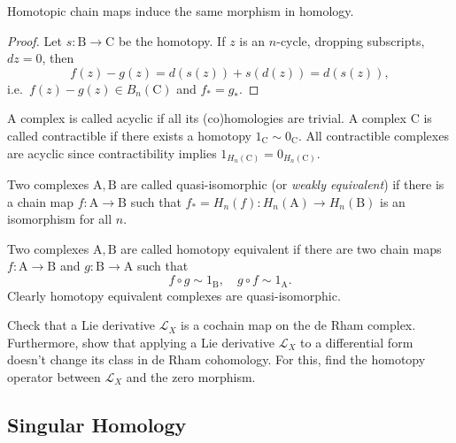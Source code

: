 \documentclass[english,letterpaper]{article}%
\numberwithin{equation}{section}
\numberwithin{figure}{section}
\numberwithin{table}{section}
\theoremstyle{definition}
\theoremstyle{definition}
\theoremstyle{definition}
\theoremstyle{plain}
\theoremstyle{plain}
\theoremstyle{plain}
\theoremstyle{plain}
\theoremstyle{remark}
\theoremstyle{remark}
\newcommand{\bm}[1]{\boldsymbol{\mathrm{#1}}}
\newcommand{\Lie}{\mathcal{L}}
\begin{document}
\begin{thm}
    Homotopic chain maps induce the same morphism in homology.
\end{thm}
\begin{proof}
     Let $s:\bm{B}\to\bm{C}$ be the homotopy. If $z$ is an $n$-cycle, dropping subscripts, $d z=0$, then
     \[f(z)-g(z)=d(s(z))+s(d(z))=d(s(z)),\]
     i.e.\ $f(z)-g(z)\in B_n(\bm{C})$ and $f_\ast=g_\ast$.
\end{proof}

\begin{defn}
    A complex is called acyclic if all its (co)homologies are trivial. A complex $\bm{C}$ is called contractible if there exists a homotopy $1_{\bm{C}}\sim 0_{\bm{C}}$. 
    All contractible complexes are acyclic since contractibility implies $1_{H_n(\bm{C})}=0_{H_n(\bm{C})}$.
\end{defn}

\begin{defn}
    Two complexes $\bm{A},\bm{B}$ are called quasi-isomorphic (or \emph{weakly equivalent}) if there is a chain map $f:\bm{A}\to \bm{B}$ such that $f_\ast=H_n(f):H_n(\bm{A})\to H_n(\bm{B})$ is an isomorphism for all $n$.
\end{defn}

\begin{defn}
    Two complexes $\bm{A},\bm{B}$ are called homotopy equivalent if there are two chain maps $f:\bm{A}\to \bm{B}$ and $g:\bm{B}\to\bm{A}$ such that
    \[f\circ g\sim 1_{\bm{B}},\quad g\circ f\sim 1_{\bm{A}}.\]
    Clearly homotopy equivalent complexes are quasi-isomorphic.
\end{defn}


\begin{xca}\label{Lie derivative homotopy operator}
    Check that a Lie derivative $\Lie_X$ is a cochain map on the de Rham complex. Furthermore, show that applying a Lie derivative $\Lie_X$ to a differential form doesn't change its class in de Rham cohomology. For this, find the homotopy operator between $\Lie_X$ and the zero morphism.
\end{xca}


\subsection{Singular Homology}
\end{document}

